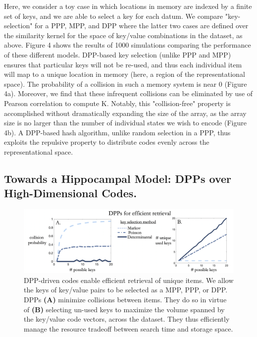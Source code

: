 \documentclass[10pt,letterpaper]{article}
\begin{document}
Here, we consider a toy case in which locations in memory are indexed by a finite set of keys, and we are able to select a key for each datum. We compare "key-selection" for a PPP, MPP, and DPP where the latter two cases are defined over the similarity kernel for the space of key/value combinations in the dataset, as above. Figure 4 shows the results of 1000 simulations comparing the performance of these different models. DPP-based key selection (unlike PPP and MPP) ensures that particular keys will not be re-used, and thus each individual item will map to a unique location in memory (here, a region of the representational space). The probability of a collision in such a memory system is near 0 (Figure 4a). Moreover, we find that these infrequent collisions can be eliminated by use of Pearson correlation to compute K. Notably, this "collision-free" property is accomplished without dramatically expanding the size of the array, as the array size is no larger than the number of individual states we wish to encode (Figure 4b). A DPP-based hash algorithm, unlike random selection in a PPP, thus exploits the repulsive property to distribute codes evenly across the representational space.


\subsection{Towards a Hippocampal Model: DPPs over High-Dimensional Codes.}

\begin{figure}[h]
  \centering \includegraphics[width=\textwidth]{Figure4.png}
  \caption{DPP-driven codes enable efficient retrieval of unique items. We allow the keys of key/value pairs to be selected as a MPP, PPP, or DPP. DPPs \textbf{(A)} minimize collisions between items. They do so in virtue of \textbf{(B)} selecting un-used keys to maximize the volume spanned by the key/value code vectors, across the dataset. They thus efficiently manage the resource tradeoff between search time and storage space.}
\end{figure}
\end{document}
